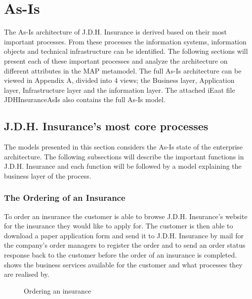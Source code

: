 \section{As-Is}
\label{sec:as_is}
The As-Is architecture of J.D.H. Insurance is derived based on their most important processes. From these processes the information systems, information objects and technical infrastructure can be identified. The following sections will present each of these important processes and analyze the architecture on different attributes in the MAP metamodel. The full As-Is architecture can be viewed in Appendix A, divided into 4 views; the Business layer, Application layer, Infrastructure layer and the information layer. The attached iEaat file JDHInsuranceAsIs also contains the full As-Is model.
%
\subsection{J.D.H. Insurance's most core processes}
\label{sec:coreShit}
The models presented in this section considers the As-Is state of the enterprise architecture. The following subsections will describe the important functions in J.D.H. Insurance and each function will be followed by a model explaining the business layer of the process.
%
\subsubsection{The Ordering of an Insurance}
\label{sec:order}
To order an insurance the customer is able to browse J.D.H. Insurance's website for the insurance they would like to apply for. The customer is then able to download a paper application form and send it to J.D.H. Insurance by mail for the company's order managers to register the order and to send an order status response back to the customer before the order of an insurance is completed.  shows the business services available for the customer and what processes they are realised by.
\begin{center}
	\begin{figure}[H]
		\centering
		\setlength\fboxsep{7pt}
		\setlength\fboxrule{0.5pt}
		\caption{Ordering an insurance}
		\label{fig:map_order}
	\end{figure}
\end{center}
